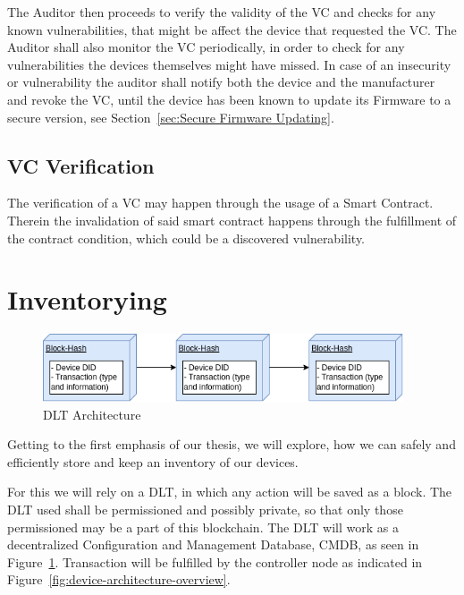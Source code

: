 The Auditor then proceeds to verify the validity of the VC and checks for any known vulnerabilities, that might be
affect the device that requested the VC. The Auditor shall also monitor the VC periodically, in order to check for any
vulnerabilities the devices themselves might have missed. In case of an insecurity or vulnerability the auditor shall
notify both the device and the manufacturer and revoke the VC, until the device has been known to update its Firmware to
a secure version, see Section~\ref{sec:Secure Firmware Updating}.

\subsection{VC Verification} %
\label{sub:VC Verification}
The verification of a VC may happen through the usage of a Smart Contract. Therein the invalidation of
said smart contract happens through the fulfillment of the contract condition, which could be a discovered
vulnerability.



\section{Inventorying} %
\label{sec:Inventorying}

\begin{figure}
	\begin{center}
		\includegraphics[width=0.95\textwidth]{figures/dlt-architecture.png}
	\end{center}
	\caption{DLT Architecture}
	\label{fig:dlt-architecture}
\end{figure}

Getting to the first emphasis of our thesis, we will explore, how we can safely and efficiently store and keep an
inventory of our devices.

For this we will rely on a DLT, in which any action will be saved as a block. The DLT used shall be permissioned and
possibly private, so that only those permissioned may be a part of this blockchain.
The DLT will work as a decentralized Configuration and Management Database, CMDB, as seen in
Figure~\ref{fig:dlt-architecture}. Transaction will be fulfilled by the controller node as indicated in
Figure~\ref{fig:device-architecture-overview}.


